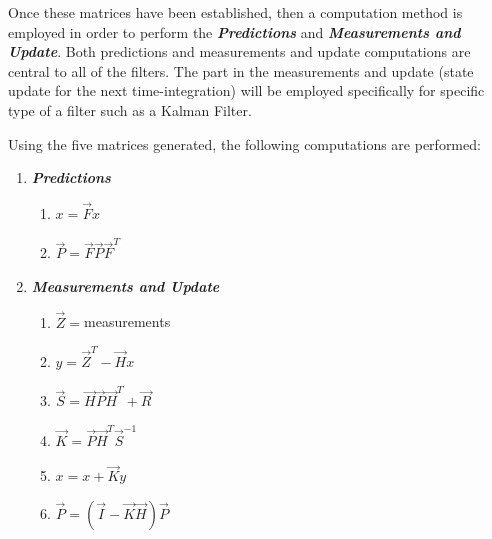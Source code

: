 Once these matrices have been established, then a computation method is employed in order to perform the \textbf{\textit{Predictions}} and \textbf{\textit{Measurements and Update}}. Both predictions and measurements and update computations are central to all of the filters. The part in the measurements and update (state update for the next time-integration) will be employed specifically for specific type of a filter such as a Kalman Filter. 

Using the five matrices generated, the following computations are performed:
\begin{enumerate}
	\item \textbf{\textit{Predictions}}
	\begin{enumerate}
		\item $x = \vec{F} x$
		\item $\vec{P} = \vec{F}\vec{P}\vec{F}^{T} $
	\end{enumerate}
	\item \textbf{\textit{Measurements and Update}}
	\begin{enumerate}
		\item $\vec{Z} = $measurements
		\item $y = \vec{Z}^{T} - \vec{H}x$
		\item $\vec{S} = \vec{H}\vec{P}\vec{H}^{T} + \vec{R}$
		\item $\vec{K} = \vec{P}\vec{H}^{T}\vec{S}^{-1}$
		\item $x = x + \vec{K}y$
		\item $\vec{P} = (\vec{I} - \vec{K}\vec{H})\vec{P}$
	\end{enumerate}
\end{enumerate} 







